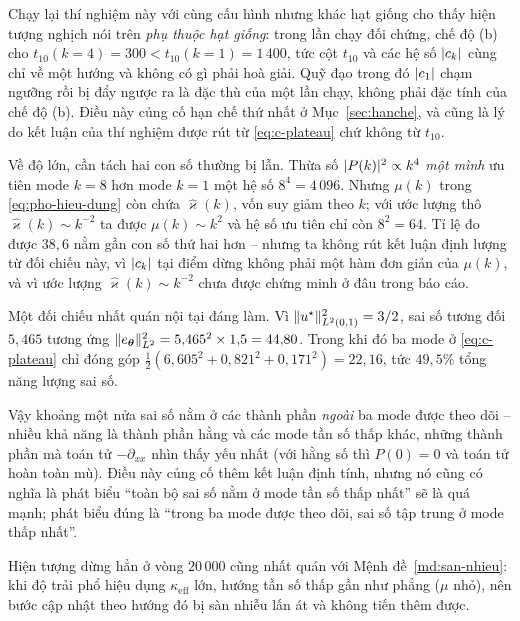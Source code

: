 Chạy lại thí nghiệm này với cùng cấu hình nhưng khác hạt giống cho thấy hiện
tượng nghịch nói trên \emph{phụ thuộc hạt giống}: trong lần chạy đối chứng,
chế độ (b) cho $t_{10}(k{=}4) = 300 < t_{10}(k{=}1) = 1\,400$, tức cột $t_{10}$
và các hệ số $\lvert c_k\rvert$ cùng chỉ về một hướng và không có gì phải hoà giải.
Quỹ đạo trong đó $\lvert c_1\rvert$ chạm ngưỡng rồi bị đẩy ngược ra là đặc thù của một
lần chạy, không phải đặc tính của chế độ (b). Điều này củng cố hạn chế thứ nhất
ở Mục~\ref{sec:hanche}, và cũng là lý do kết luận của thí nghiệm được rút từ
\eqref{eq:c-plateau} chứ không từ $t_{10}$.
 
Về độ lớn, cần tách hai con số thường bị lẫn. Thừa số $\lvert P(k)\rvert^2 \propto k^4$
\emph{một mình} ưu tiên mode $k=8$ hơn mode $k=1$ một hệ số $8^4 = 4\,096$. Nhưng
$\mu(k)$ trong \eqref{eq:pho-hieu-dung} còn chứa $\widehat{\varkappa}(k)$, vốn suy
giảm theo $k$; với ước lượng thô $\widehat{\varkappa}(k)\sim k^{-2}$ ta được
$\mu(k) \sim k^{2}$ và hệ số ưu tiên chỉ còn $8^2 = 64$. Tỉ lệ đo được $38{,}6$
nằm gần con số thứ hai hơn -- nhưng ta không rút kết luận định lượng từ đối chiếu
này, vì $\lvert c_k\rvert$ tại điểm dừng không phải một hàm đơn giản của $\mu(k)$, và vì
ước lượng $\widehat{\varkappa}(k)\sim k^{-2}$ chưa được chứng minh ở đâu trong
báo cáo.
 
\begin{nhanxet}
\label{nx:nang-luong}
Một đối chiếu nhất quán nội tại đáng làm. Vì
$\lVert u^{\star}\rVert^2_{L^2(0,1)} = 3/2$, sai số tương đối $5{,}465$ tương ứng
$\lVert e_{\bm{\theta}}\rVert^2_{L^2} = 5{,}465^2\times 1{,}5 = 44{,}80$. Trong khi đó ba
mode ở \eqref{eq:c-plateau} chỉ đóng góp
$\tfrac12(6{,}605^2 + 0{,}821^2 + 0{,}171^2) = 22{,}16$, tức $49{,}5\%$ tổng năng
lượng sai số.
 
Vậy khoảng một nửa sai số nằm ở các thành phần \emph{ngoài} ba mode được theo dõi
-- nhiều khả năng là thành phần hằng và các mode tần số thấp khác, những thành
phần mà toán tử $-\partial_{xx}$ nhìn thấy yếu nhất (với hằng số thì
$P(0) = 0$ và toán tử hoàn toàn mù). Điều này củng cố thêm kết luận định tính,
nhưng nó cũng có nghĩa là phát biểu ``toàn bộ sai số nằm ở mode tần số thấp nhất''
sẽ là quá mạnh; phát biểu đúng là ``trong ba mode được theo dõi, sai số tập trung
ở mode thấp nhất''.
\end{nhanxet}
 
Hiện tượng dừng hẳn ở vòng $20\,000$ cũng nhất quán với
Mệnh đề~\ref{md:san-nhieu}: khi độ trải phổ hiệu dụng $\kappa_{\mathrm{eff}}$ lớn,
hướng tần số thấp gần như phẳng ($\mu$ nhỏ), nên bước cập nhật theo hướng đó bị
sàn nhiễu lấn át và không tiến thêm được.
 
